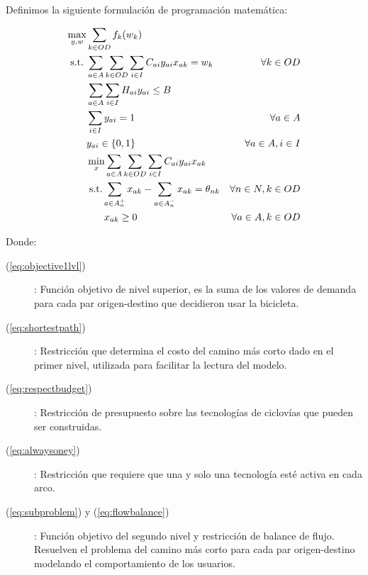 \clearpage
Definimos la siguiente formulación de programación matemática:

\begin{align}
  \max_{y,w}       & \sum_{k \in OD} f_k(w_k)                                                       & \label{eq:objective1lvl} \\
  \text{s.t.}\;  & \sum_{a \in A} \sum_{k \in OD} \sum_{i \in I} C_{ai}y_{ai}x_{ak} = w_k           & \forall k \in OD \label{eq:shortestpath} \\
                 & \sum_{a \in A} \sum_{i \in I} H_{ai}y_{ai} \leq B                                & \label{eq:respectbudget} \\
                 & \sum_{i \in I} y_{ai} = 1                                                        & \forall a \in A \label{eq:alwaysoney} \\
                 & y_{ai} \in \{0,1\}                                                               & \forall a \in A, i \in I \nonumber \\
                 & \min_{x} \sum_{a \in A} \sum_{k \in OD} \sum_{i \in I} C_{ai}y_{ai}x_{ak}        & \label{eq:subproblem} \\
                 & \;\text{s.t.} \sum_{a \in A_n^+} x_{ak} - \sum_{a \in A_n^-} x_{ak} = \theta_{nk}  & \forall n \in N, k \in OD \label{eq:flowbalance} \\
                 & \;\hspace{1.5em} x_{ak} \geq 0                                                        & \forall a \in A, k \in OD \nonumber
\end{align}

Donde:

\begin{description}
  \item[(\ref{eq:objective1lvl})]: Función objetivo de nivel superior, es la suma de los valores de demanda para cada par origen-destino que decidieron usar la bicicleta.
  \item[(\ref{eq:shortestpath})]: Restricción que determina el costo del camino más corto dado en el primer nivel, utilizada para facilitar la lectura del modelo.
  \item[(\ref{eq:respectbudget})]: Restricción de presupuesto sobre las tecnologías de ciclovías que pueden ser construidas.
  \item[(\ref{eq:alwaysoney})]: Restricción que requiere que una y solo una tecnología esté activa en cada arco.
  \item[(\ref{eq:subproblem}) y (\ref{eq:flowbalance})]: Función objetivo del segundo nivel y restricción de balance de flujo. Resuelven el problema del camino más corto para cada par origen-destino modelando el comportamiento de los usuarios.
\end{description}


